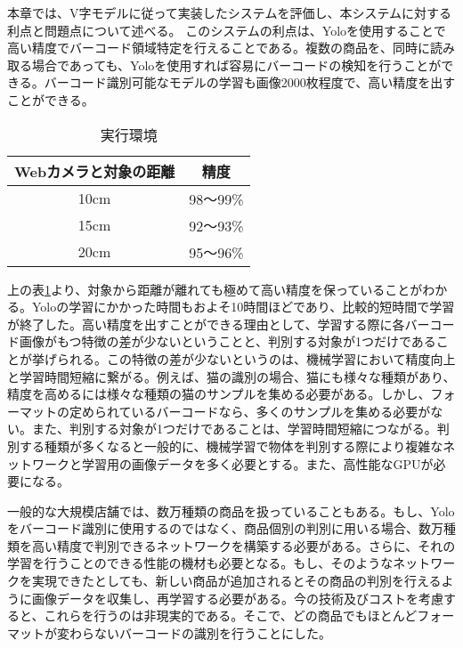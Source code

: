 本章では、V字モデルに従って実装したシステムを評価し、本システムに対する利点と問題点について述べる。
このシステムの利点は、Yoloを使用することで高い精度でバーコード領域特定を行えることである。複数の商品を、同時に読み取る場合であっても、Yoloを使用すれば容易にバーコードの検知を行うことができる。バーコード識別可能なモデルの学習も画像2000枚程度で、高い精度を出すことができる。

\begin{table}[htb]
\begin{center}
\caption{実行環境}
\begin{tabular}{|c|c|} \hline
Webカメラと対象の距離 & 精度\\ \hline
10cm & 98～99\% \\ \hline
15cm & 92～93\% \\ \hline
20cm & 95～96\% \\ \hline
\end{tabular}
\label{accurancy}
	\end{center}
\end{table}

上の表\ref{accurancy}より、対象から距離が離れても極めて高い精度を保っていることがわかる。Yoloの学習にかかった時間もおよそ10時間ほどであり、比較的短時間で学習が終了した。高い精度を出すことができる理由として、学習する際に各バーコード画像がもつ特徴の差が少ないということと、判別する対象が1つだけであることが挙げられる。この特徴の差が少ないというのは、機械学習において精度向上と学習時間短縮に繋がる\cite{deep_learning}。例えば、猫の識別の場合、猫にも様々な種類があり、精度を高めるには様々な種類の猫のサンプルを集める必要がある。しかし、フォーマットの定められているバーコードなら、多くのサンプルを集める必要がない。また、判別する対象が1つだけであることは、学習時間短縮につながる。判別する種類が多くなると一般的\cite{deep_learning}に、機械学習で物体を判別する際により複雑なネットワークと学習用の画像データを多く必要とする。また、高性能なGPUが必要になる。

一般的な大規模店舗では、数万種類の商品を扱っていることもある。もし、Yoloをバーコード識別に使用するのではなく、商品個別の判別に用いる場合、数万種類を高い精度で判別できるネットワークを構築する必要がある。さらに、それの学習を行うことのできる性能の機材も必要となる。もし、そのようなネットワークを実現できたとしても、新しい商品が追加されるとその商品の判別を行えるように画像データを収集し、再学習する必要がある。今の技術及びコストを考慮すると、これらを行うのは非現実的である。そこで、どの商品でもほとんどフォーマットが変わらないバーコードの識別を行うことにした。

